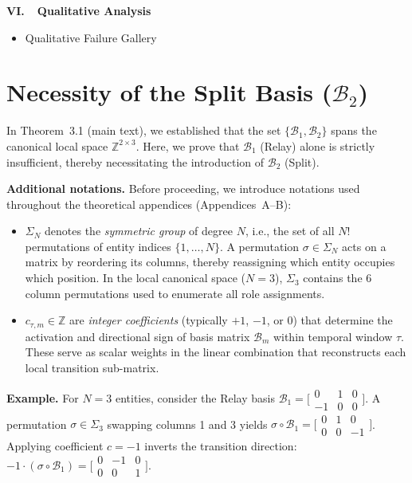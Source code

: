 \documentclass[sigconf,review,anonymous]{acmart}
\newcommand{\calB}{\mathcal{B}}
\begin{document}
\vspace{0.3em}
\noindent\textbf{VI.\ \ Qualitative Analysis}
\begin{itemize}[nosep,leftmargin=1.5em]
\item[\S\ref{app:qualitative_gallery}] Qualitative Failure Gallery
\end{itemize}



\section{Necessity of the Split Basis ($\calB_2$)}
\label{app:necessity_b2}

In Theorem~3.1 (main text), we established that the set $\{\calB_1, \calB_2\}$ spans the canonical local space $\mathbb{Z}^{2 \times 3}$. Here, we prove that $\calB_1$ (Relay) alone is strictly insufficient, thereby necessitating the introduction of $\calB_2$ (Split).

\noindent \textbf{Additional notations.} Before proceeding, we introduce notations used throughout the theoretical appendices (Appendices~A--B):
\begin{itemize}[nosep,leftmargin=*]
\item $\Sigma_N$ denotes the \emph{symmetric group} of degree $N$, i.e., the set of all $N!$ permutations of entity indices $\{1, \ldots, N\}$. A permutation $\sigma \in \Sigma_N$ acts on a matrix by reordering its columns, thereby reassigning which entity occupies which position. In the local canonical space ($N = 3$), $\Sigma_3$ contains the 6 column permutations used to enumerate all role assignments.
\item $c_{\tau,m} \in \mathbb{Z}$ are \emph{integer coefficients} (typically $+1$, $-1$, or $0$) that determine the activation and directional sign of basis matrix $\calB_m$ within temporal window $\tau$. These serve as scalar weights in the linear combination that reconstructs each local transition sub-matrix.
\end{itemize}

\noindent \textbf{Example.} For $N=3$ entities, consider the Relay basis $\calB_1 = \bigl[\begin{smallmatrix} 0 & 1 & 0 \\ -1 & 0 & 0 \end{smallmatrix}\bigr]$. A permutation $\sigma \in \Sigma_3$ swapping columns 1 and 3 yields $\sigma \circ \calB_1 = \bigl[\begin{smallmatrix} 0 & 1 & 0 \\ 0 & 0 & -1 \end{smallmatrix}\bigr]$. Applying coefficient $c = -1$ inverts the transition direction: $-1 \cdot (\sigma \circ \calB_1) = \bigl[\begin{smallmatrix} 0 & -1 & 0 \\ 0 & 0 & 1 \end{smallmatrix}\bigr]$.
\end{document}

